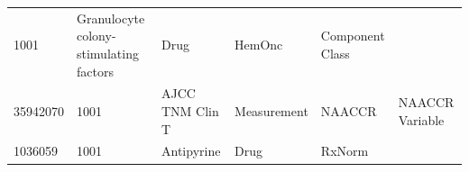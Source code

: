 \documentclass[11pt]{book}
\theoremstyle{definition}
\theoremstyle{definition}
\theoremstyle{definition}
\theoremstyle{remark}
\begin{document}
\begin{longtable}[]{@{}llllll@{}}
\begin{minipage}[t]{0.07\columnwidth}
1001\strut
\end{minipage} & \begin{minipage}[t]{0.16\columnwidth}\raggedright\strut
Granulocyte colony-stimulating factors\strut
\end{minipage} & \begin{minipage}[t]{0.14\columnwidth}\raggedright\strut
Drug\strut
\end{minipage} & \begin{minipage}[t]{0.14\columnwidth}\raggedright\strut
HemOnc\strut
\end{minipage} & \begin{minipage}[t]{0.14\columnwidth}\raggedright\strut
Component Class\strut
\end{minipage}\tabularnewline
\begin{minipage}[t]{0.13\columnwidth}\raggedright\strut
35942070\strut
\end{minipage} & \begin{minipage}[t]{0.07\columnwidth}\raggedright\strut
1001\strut
\end{minipage} & \begin{minipage}[t]{0.16\columnwidth}\raggedright\strut
AJCC TNM Clin T\strut
\end{minipage} & \begin{minipage}[t]{0.14\columnwidth}\raggedright\strut
Measurement\strut
\end{minipage} & \begin{minipage}[t]{0.14\columnwidth}\raggedright\strut
NAACCR\strut
\end{minipage} & \begin{minipage}[t]{0.14\columnwidth}\raggedright\strut
NAACCR Variable\strut
\end{minipage}\tabularnewline
\begin{minipage}[t]{0.13\columnwidth}\raggedright\strut
1036059\strut
\end{minipage} & \begin{minipage}[t]{0.07\columnwidth}\raggedright\strut
1001\strut
\end{minipage} & \begin{minipage}[t]{0.16\columnwidth}\raggedright\strut
Antipyrine\strut
\end{minipage} & \begin{minipage}[t]{0.14\columnwidth}\raggedright\strut
Drug\strut
\end{minipage} & \begin{minipage}[t]{0.14\columnwidth}\raggedright\strut
RxNorm\strut
\end{minipage} & \begin{minipage}[t]{0.14\columnwidth}\raggedright\strut

\end{minipage}
\end{longtable}
\end{document}
